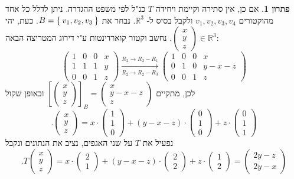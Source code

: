 \documentclass[12pt]{report}
\theoremstyle{plain}
\theoremstyle{definition}
\newtheorem*{solution}{פתרון}
\newcommand{\R}{\mathbb{R}}
\newcommand{\0}{\mathbf{0}}
\begin{document}
\begin{solution}
אם כן, אין סתירה וקיימת ויחידה
$T$
כנ"ל לפי משפט ההגדרה. ניתן לדלל כל אחד מהוקטורים
$v_1,v_2,v_3,v_4$
ולקבל בסיס ל-
$\R^3$.
נבחר את
$B=\Set{v_1,v_2,v_3}$.
כעת, יהי
$\begin{pmatrix}x\\y\\z\end{pmatrix}\in\R^3$.
נחשב וקטור קוארדינטות ע"י דירוג המטריצה הבאה:
$$
\left(\begin{array}{ccc|c}
1 & 0 & 0 & x \\
1 & 1 & 1 & y \\
0 & 0 & 1 & z
\end{array}\right)\xrightarrow[R_2\to R_2-R_3]{R_2\to R_2-R_1}\left(\begin{array}{ccc|c}
1 & 0 & 0 & x \\
0 & 1 & 0 & y-x-z \\
0 & 0 & 1 & z
\end{array}\right)
$$
לכן, מתקיים 
$\left[\begin{pmatrix}x\\y\\z\end{pmatrix}\right]_B=\begin{pmatrix}x\\y-x-z\\z\end{pmatrix}$
ובאופן שקול
$$
.\begin{pmatrix}x\\y\\z\end{pmatrix}=x\cdot\begin{pmatrix}1\\1\\0\end{pmatrix}+(y-x-z)\cdot\begin{pmatrix}0\\1\\0\end{pmatrix}+z\cdot\begin{pmatrix}0\\1\\1\end{pmatrix}
$$
נפעיל את 
$T$
על שני האגפים, נציב את הנתונים ונקבל
$$
.T\begin{pmatrix}x\\y\\z\end{pmatrix}=x\cdot\begin{pmatrix}2\\1\end{pmatrix}+(y-x-z)\cdot\begin{pmatrix}2\\2\end{pmatrix}+z\cdot\begin{pmatrix}1\\2\end{pmatrix}=\begin{pmatrix}2y-z\\2y-x\end{pmatrix}
$$
\end{solution}
\end{document}
